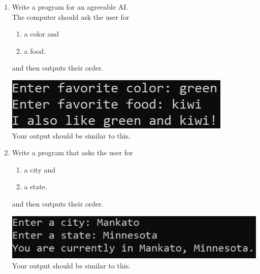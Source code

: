 \documentclass{article}
\begin{document}
\begin{enumerate}
	\item 
		Write a program for an agreeable AI.\\
		The computer should ask the user for \\
		\begin{minipage}{0.5\textwidth}
		\vspace*{-0.5em}
			\begin{enumerate}  \setlength\itemsep{-0.3em}
				\item a color and
				\item a food.  
			\end{enumerate} \vspace*{-1ex}
		and then outputs their order.
		\end{minipage}
		\begin{minipage}{0.5\textwidth}
			\centering
			\includegraphics[scale=0.75]{./imgs/agreeableAIoutput.png}\\
			Your output should be similar to this.
		\end{minipage}


	\item 
		Write a program that asks the user for \\
		\begin{minipage}{0.5\textwidth}
		\vspace*{-0.5em}
			\begin{enumerate}  \setlength\itemsep{-0.3em}
				\item a city and
				\item a state.  
			\end{enumerate} \vspace*{-1ex}
		and then outputs their order.
		\end{minipage}
		\begin{minipage}{0.5\textwidth}
			\centering
			\includegraphics[scale=0.75]{./imgs/locationOutput.png}\\
			Your output should be similar to this.
		\end{minipage}



\end{enumerate}
\end{document}
